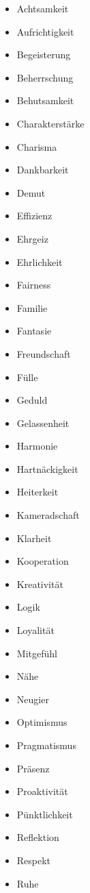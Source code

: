 \documentclass[../Lebensziel.tex]{subfiles}
\begin{document}
\begin{multicols}{3}
    \begin{itemize}
        \item Achtsamkeit
        \item Aufrichtigkeit
        \item Begeisterung
        \item Beherrschung
        \item Behutsamkeit
        \item Charakterstärke
        \item Charisma
        \item Dankbarkeit
        \item Demut
        \item Effizienz
        \item Ehrgeiz
        \item Ehrlichkeit
        \item Fairness
        \item Familie
        \item Fantasie
        \item Freundschaft
        \item Fülle
        \item Geduld
        \item Gelassenheit
        \item Harmonie
        \item Hartnäckigkeit
        \item Heiterkeit
        \item Kameradschaft
        \item Klarheit
        \item Kooperation
        \item Kreativität
        \item Logik
        \item Loyalität
        \item Mitgefühl
        \item Nähe
        \item Neugier
        \item Optimismus
        \item Pragmatismus
        \item Präsenz
        \item Proaktivität
        \item Pünktlichkeit
        \item Reflektion
        \item Respekt
        \item Ruhe

\end{itemize}
\end{multicols}
\end{document}

